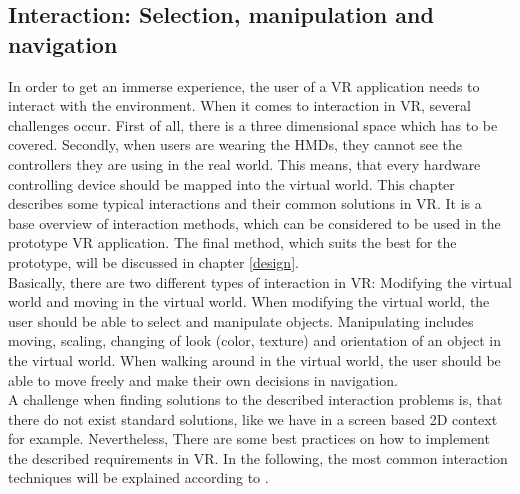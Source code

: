 \subsection{Interaction: Selection, manipulation and navigation}
In order to get an immerse experience, the user of a VR application needs to interact with the environment. When it comes to interaction in VR, several challenges occur. First of all, there is a three dimensional space which has to be covered. Secondly, when users are wearing the HMDs, they cannot see the controllers they are using in the real world. This means, that every hardware controlling device should be mapped into the virtual world. This chapter describes some typical interactions and their common solutions in VR. It is a base overview of interaction methods, which can be considered to be used in the prototype VR application. The final method, which suits the best for the prototype, will be discussed in chapter \ref{design}.\\
Basically, there are two different types of interaction in VR: Modifying the virtual world and moving in the virtual world. When modifying the virtual world, the user should be able to select and manipulate objects. Manipulating includes moving, scaling, changing of look (color, texture) and orientation of an object in the virtual world. When walking around in the virtual world, the user should be able to move freely and make their own decisions in navigation. \cite{Dorner.2013}\\
A challenge when finding solutions to the described interaction problems is, that there do not exist standard solutions, like we have in a screen based 2D context for example. Nevertheless, There are some best practices on how to implement the described requirements in VR. In the following, the most common interaction techniques will be explained according to \cite{Dorner.2013}.

